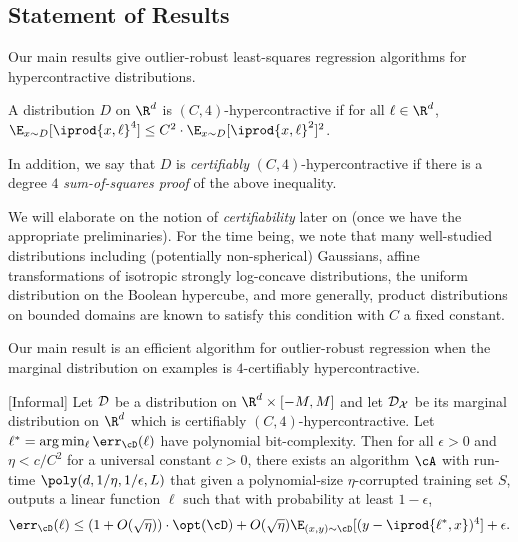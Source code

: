 \subsection{Statement of Results}
Our main results give outlier-robust least-squares regression algorithms for  hypercontractive distributions.  %
\begin{definition}[$4$-Hypercontractivity]
A distribution $D$ on $\R^d$ is $(C,4)$-hypercontractive if for all $\ell \in \R^d$, $\E_{x \sim D}[\iprod{x,\ell}^4] \leq C^2 \cdot \E_{x \sim D}[\iprod{x,\ell}^2]^2$. 

In addition, we say that $D$ is \emph{certifiably} $(C,4)$-hypercontractive if there is a degree $4$ \emph{sum-of-squares proof} of the above inequality.
\end{definition}

We will elaborate on the notion of \emph{certifiability} later on (once we have the appropriate preliminaries). For the time being, we note that many well-studied distributions including (potentially non-spherical) Gaussians, affine transformations of isotropic strongly log-concave distributions, the uniform distribution on the Boolean hypercube, and more generally, product distributions on bounded domains are known to satisfy this condition with $C$ a fixed constant. 

Our main result is an efficient algorithm for outlier-robust regression when the marginal distribution on examples is $4$-certifiably hypercontractive.

\begin{theorem}\label{th:intro4}[Informal]
Let ${\cal D}$ be a distribution on $\R^{d} \times [-M,M]$ and let ${\cal D_{X}}$ be its
marginal distribution on $\R^d$ which is certifiably $(C,4)$-hypercontractive. Let $\ell^* = \arg\min_{\ell} \err_{\cD}(\ell)$ have polynomial bit-complexity. Then for all $\epsilon > 0$ and $\eta < c/C^2$ for a universal constant $c > 0$,  there exists an algorithm $\cA$ with run-time $\poly(d,1/\eta,1/\epsilon,L)$ that given a polynomial-size $\eta$-corrupted training set $S$, outputs a linear function $\ell$ such that with probability at least  $1-\epsilon$, 
$$\err_{\cD}(\ell) \leq (1 + O(\sqrt{\eta})) \cdot \opt(\cD)  + O(\sqrt{\eta}) \E_{(x,y) \sim \cD}[(y - \iprod{\ell^*,x})^4] + \epsilon.$$

\end{theorem}

